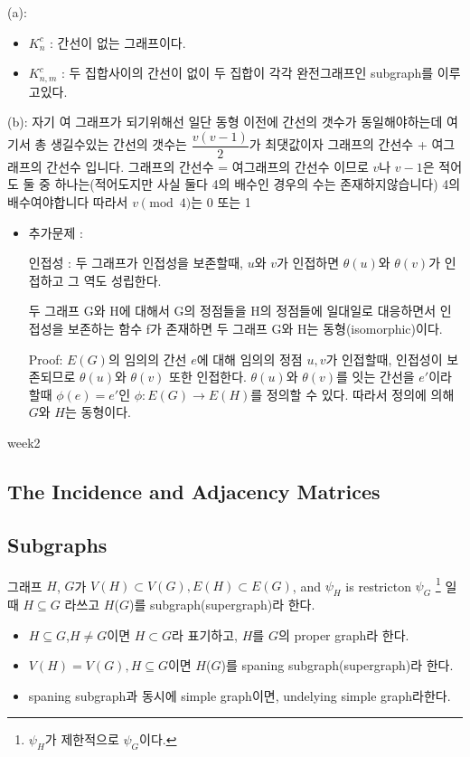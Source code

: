 \documentclass{oblivoir}
\begin{document}
\subsubsection{}
\subsubsection{}
(a):
\begin{itemize}
    \item $K_{n}^{c}$ : 간선이 없는 그래프이다.
    \item $K_{n,m}^{c}$ : 두 집합사이의 간선이 없이 두 집합이 각각 완전그래프인 subgraph를 이루고있다.
\end{itemize}
(b): 자기 여 그래프가 되기위해선 일단 동형 이전에 간선의 갯수가 동일해야하는데 여기서 총 생길수있는 간선의 갯수는 $\dfrac{v(v-1)}{2}$가 최댓값이자 그래프의 간선수 + 여그래프의 간선수 입니다. 그래프의 간선수 = 여그래프의 간선수 이므로 $v$나 $v-1$은 적어도 둘 중 하나는(적어도지만 사실 둘다 4의 배수인 경우의 수는 존재하지않습니다) 4의 배수여야합니다 따라서 $v\pmod{4}$는 0 또는 1


\begin{itemize}
\item 추가문제 :

인접성 : 두 그래프가 인접성을 보존할때, $u$와 $v$가 인접하면 $\theta(u)$와  $\theta(v)$가 인접하고 그 역도 성립한다. 

두 그래프 G와 H에 대해서 G의 정점들을 H의 정점들에 일대일로 대응하면서 
인접성을 보존하는 함수 f가 존재하면 두 그래프 G와 H는 동형(isomorphic)이다.

Proof: $E(G)$의 임의의 간선 $e$에 대해 임의의 정점 $u,v$가 인접할때, 인접성이 보존되므로 $\theta(u)$와  $\theta(v)$ 또한 인접한다.
$\theta(u)$와  $\theta(v)$를 잇는 간선을 $e'$이라 할때 $\phi(e) = e'$인 $\phi: E(G) \longrightarrow E(H)$를 정의할 수 있다.
따라서 정의에 의해 $G$와 $H$는 동형이다.
\end{itemize}

week2

\subsection{The Incidence and Adjacency Matrices}
\subsection{Subgraphs}
\begin{dfn}[subgraph]
    그래프 $H$, $G$가 $ V(H) \subset V(G), E(H) \subset E(G)$, and $\psi_{H}$ is restricton $\psi_{G}$ \protect\footnote{$\psi_{H}$가 제한적으로 $\psi_{G}$이다.} 일때  $H \subseteq G$ 라쓰고 $H$($G$)를 subgraph(supergraph)라 한다.

    \begin{itemize}
        \item $H \subseteq G$,$H\neq G $이면 $ H \subset G$라 표기하고, $H$를  $G$의 proper graph라 한다.
        \item $V(H) = V(G) , H \subseteq G $이면 $H$($G$)를  spaning subgraph(supergraph)라 한다.
        \item spaning subgraph과 동시에 simple graph이면, undelying simple graph라한다.
    \end{itemize}
\end{dfn}
\end{document}
